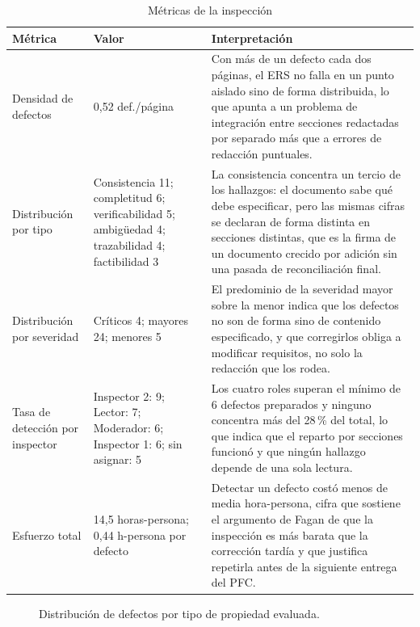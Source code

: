 \documentclass[11pt,letterpaper]{article}
\begin{document}
\begin{table}[H]
\centering
\caption{Métricas de la inspección}
\begin{tabular}{L{5.5cm} L{3cm} L{6cm}}
\toprule
\textbf{Métrica} & \textbf{Valor} & \textbf{Interpretación}\\
\midrule
Densidad de defectos & 0,52 def./página & Con más de un defecto cada dos páginas, el ERS no falla en un punto aislado sino de forma distribuida, lo que apunta a un problema de integración entre secciones redactadas por separado más que a errores de redacción puntuales.\\
Distribución por tipo & Consistencia 11; completitud 6; verificabilidad 5; ambigüedad 4; trazabilidad 4; factibilidad 3 & La consistencia concentra un tercio de los hallazgos: el documento sabe qué debe especificar, pero las mismas cifras se declaran de forma distinta en secciones distintas, que es la firma de un documento crecido por adición sin una pasada de reconciliación final.\\
Distribución por severidad & Críticos 4; mayores 24; menores 5 & El predominio de la severidad mayor sobre la menor indica que los defectos no son de forma sino de contenido especificado, y que corregirlos obliga a modificar requisitos, no solo la redacción que los rodea.\\
Tasa de detección por inspector & Inspector 2: 9; Lector: 7; Moderador: 6; Inspector 1: 6; sin asignar: 5 & Los cuatro roles superan el mínimo de 6 defectos preparados y ninguno concentra más del 28\,\% del total, lo que indica que el reparto por secciones funcionó y que ningún hallazgo depende de una sola lectura.\\
Esfuerzo total & 14,5 horas-persona; 0,44 h-persona por defecto & Detectar un defecto costó menos de media hora-persona, cifra que sostiene el argumento de Fagan de que la inspección es más barata que la corrección tardía \cite{fagan1976} y que justifica repetirla antes de la siguiente entrega del PFC.\\
\bottomrule
\end{tabular}
\end{table}

\begin{figure}[H]
\centering
{}
\caption{Distribución de defectos por tipo de propiedad evaluada.}
\end{figure}
\end{document}
